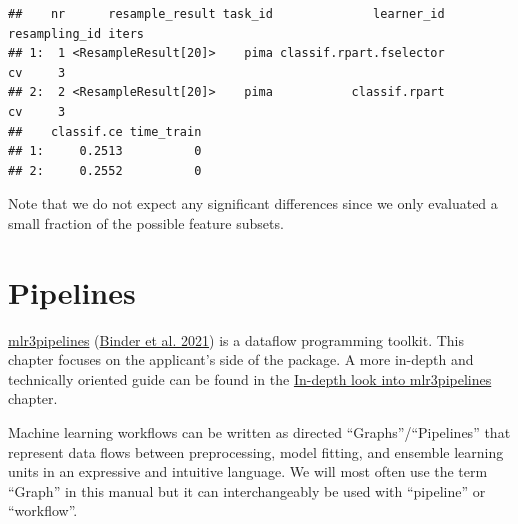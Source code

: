 \documentclass[
]{scrbook}
\newenvironment{Shaded}{\begin{snugshade}}{\end{snugshade}}
\newcommand{\AttributeTok}[1]{\textcolor[rgb]{0.77,0.63,0.00}{#1}}
\newcommand{\ConstantTok}[1]{\textcolor[rgb]{0.00,0.00,0.00}{#1}}
\newcommand{\DecValTok}[1]{\textcolor[rgb]{0.00,0.00,0.81}{#1}}
\newcommand{\FunctionTok}[1]{\textcolor[rgb]{0.00,0.00,0.00}{#1}}
\newcommand{\NormalTok}[1]{#1}
\newcommand{\OtherTok}[1]{\textcolor[rgb]{0.56,0.35,0.01}{#1}}
\newcommand{\SpecialCharTok}[1]{\textcolor[rgb]{0.00,0.00,0.00}{#1}}
\newcommand{\StringTok}[1]{\textcolor[rgb]{0.31,0.60,0.02}{#1}}
\renewenvironment{Shaded} {\begin{snugshade}\small} {\end{snugshade}}
\begin{document}
\begin{Shaded}
\end{Shaded}

\begin{verbatim}
##    nr      resample_result task_id              learner_id resampling_id iters
## 1:  1 <ResampleResult[20]>    pima classif.rpart.fselector            cv     3
## 2:  2 <ResampleResult[20]>    pima           classif.rpart            cv     3
##    classif.ce time_train
## 1:     0.2513          0
## 2:     0.2552          0
\end{verbatim}

Note that we do not expect any significant differences since we only evaluated a small fraction of the possible feature subsets.

\hypertarget{pipelines}{%
\chapter{Pipelines}\label{pipelines}}

\href{https://mlr3pipelines.mlr-org.com}{mlr3pipelines} (\protect\hyperlink{ref-mlr3pipelines}{Binder et al. 2021}) is a dataflow programming toolkit.
This chapter focuses on the applicant's side of the package.
A more in-depth and technically oriented guide can be found in the \protect\hyperlink{in-depth-pipelines}{In-depth look into mlr3pipelines} chapter.

Machine learning workflows can be written as directed ``Graphs''/``Pipelines'' that represent data flows between preprocessing, model fitting, and ensemble learning units in an expressive and intuitive language.
We will most often use the term ``Graph'' in this manual but it can interchangeably be used with ``pipeline'' or ``workflow''.
\end{document}
